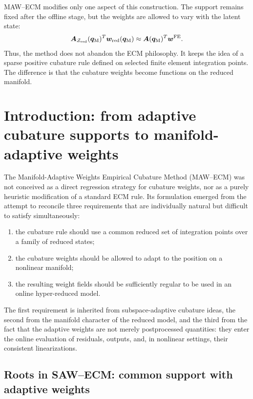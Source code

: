 \documentclass[11pt,a4paper]{article}
\begin{document}
MAW--ECM modifies only one aspect of this construction. The support remains
fixed after the offline stage, but the weights are allowed to vary with the
latent state:
\[
        \bm A_{\mathcal{Z}_{\mathrm{red}}}(\bm q_{\mathrm{M}})^T\bm w_{\mathrm{red}}(\bm q_{\mathrm{M}})
        \approx
        \bm A(\bm q_{\mathrm{M}})^T\bm w^{\mathrm{FE}} .
\]
Thus, the method does not abandon the ECM philosophy. It keeps the idea of a
sparse positive cubature rule defined on selected finite element integration
points. The difference is that the cubature weights become functions on the
reduced manifold.


\section{Introduction: from adaptive cubature supports to manifold-adaptive weights}
\label{sec:introduction_history}

The Manifold-Adaptive Weights Empirical Cubature Method (MAW--ECM) was not
conceived as a direct regression strategy for cubature weights, nor as a purely
heuristic modification of a standard ECM rule. Its formulation emerged from the
attempt to reconcile three requirements that are individually natural but
difficult to satisfy simultaneously:
\begin{enumerate}[label=(\roman*),leftmargin=1.1cm]
    \item the cubature rule should use a common reduced set of integration
    points over a family of reduced states;
    \item the cubature weights should be allowed to adapt to the position on a
    nonlinear manifold;
    \item the resulting weight fields should be sufficiently regular to be used
    in an online hyper-reduced model.
\end{enumerate}
The first requirement is inherited from subspace-adaptive cubature ideas, the
second from the manifold character of the reduced model, and the third from the
fact that the adaptive weights are not merely postprocessed quantities: they
enter the online evaluation of residuals, outputs, and, in nonlinear settings,
their consistent linearizations.

\subsection{Roots in SAW--ECM: common support with adaptive weights}
\end{document}
